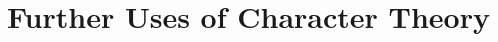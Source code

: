 \documentclass[../Project.tex]{subfiles}
\begin{document}
\newpage
\section{Further Uses of Character Theory}

\begin{theo}[Burnside]
\end{theo}
\end{document}
